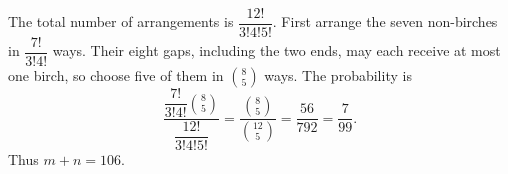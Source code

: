 The total number of arrangements is $\dfrac{12!}{3!4!5!}$. First arrange the seven non-birches in $\dfrac{7!}{3!4!}$ ways. Their eight gaps, including the two ends, may each receive at most one birch, so choose five of them in $\binom85$ ways. The probability is
\[
\dfrac{\dfrac{7!}{3!4!}\binom85}{\dfrac{12!}{3!4!5!}}
=\dfrac{\binom85}{\binom{12}{5}}
=\dfrac{56}{792}=\dfrac{7}{99}.
\]
Thus $\boxed{m+n=106}$.
